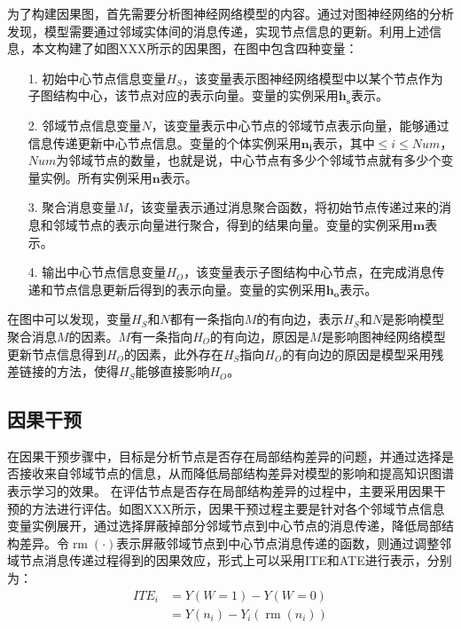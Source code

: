 \documentclass[algorithmlist, AutoFakeBold, AutoFakeSlant, figurelist, tablelist, nomlist, masters]{seuthesix}
\begin{document}
为了构建因果图，首先需要分析图神经网络模型的内容。通过对图神经网络的分析发现，模型需要通过邻域实体间的消息传递，实现节点信息的更新。利用上述信息，本文构建了如图XXX所示的因果图，在图中包含四种变量：
\begin{itemize}
  \item [1.] 初始中心节点信息变量$H_S$，该变量表示图神经网络模型中以某个节点作为子图结构中心，该节点对应的表示向量。变量的实例采用$\bm{h_s}$表示。
  \item [2.] 邻域节点信息变量$N$，该变量表示中心节点的邻域节点表示向量，能够通过信息传递更新中心节点信息。变量的个体实例采用$\bm{n_i}$表示，其中$\leq i \leq Num$，$Num$为邻域节点的数量，也就是说，中心节点有多少个邻域节点就有多少个变量实例。所有实例采用$\bm{n}$表示。
  \item [3.] 聚合消息变量$M$，该变量表示通过消息聚合函数，将初始节点传递过来的消息和邻域节点的表示向量进行聚合，得到的结果向量。变量的实例采用$\bm{m}$表示。
  \item [4.] 输出中心节点信息变量$H_O$，该变量表示子图结构中心节点，在完成消息传递和节点信息更新后得到的表示向量。变量的实例采用$\bm{h_o}$表示。
\end{itemize}
在图中可以发现，变量$H_S$和$N$都有一条指向$M$的有向边，表示$H_S$和$N$是影响模型聚合消息$M$的因素。$M$有一条指向$H_O$的有向边，原因是$M$是影响图神经网络模型更新节点信息得到$H_O$的因素，此外存在$H_S$指向$H_O$的有向边的原因是模型采用残差链接的方法，使得$H_S$能够直接影响$H_O$。

\subsection{因果干预}
在因果干预步骤中，目标是分析节点是否存在局部结构差异的问题，并通过选择是否接收来自邻域节点的信息，从而降低局部结构差异对模型的影响和提高知识图谱表示学习的效果。
在评估节点是否存在局部结构差异的过程中，主要采用因果干预的方法进行评估。如图XXX所示，因果干预过程主要是针对各个邻域节点信息变量实例展开，通过选择屏蔽掉部分邻域节点到中心节点的消息传递，降低局部结构差异。令$\operatorname{rm}(\cdot)$表示屏蔽邻域节点到中心节点消息传递的函数，则通过调整邻域节点消息传递过程得到的因果效应，形式上可以采用ITE和ATE进行表示，分别为：
\begin{equation}
  \begin{aligned}
    ITE_i & =Y(W=1) - Y(W=0) \\
    & =Y(n_i)-Y_i(\operatorname{rm}(n_i))
  \end{aligned}
  \label{equation_CausalInterventionITE}
\end{equation}
\end{document}
